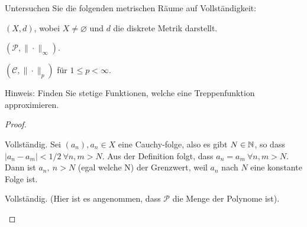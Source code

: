 \begin{Problem}
	Untersuchen Sie die folgenden metrischen Räume auf Vollständigkeit:
	\begin{parts}
	\item $(X,d)$, wobei $X\neq \varnothing$ und $d$ die diskrete Metrik darstellt.
	\item $(\mathcal{P},\|\cdot\|_\infty)$.
	\item $(\mathcal{C},\|\cdot\|_p)$ f\"{u}r $1\le p < \infty$.

		{\footnotesize Hinweis: Finden Sie stetige Funktionen, welche eine Treppenfunktion approximieren.}  
	\end{parts}
\end{Problem}
\begin{proof}
	\begin{parts}
	\item Vollständig. Sei $(a_n),a_n\in X$ eine Cauchy-folge, also es gibt $N\in \mathbb{N}$, so dass $|a_n-a_m|<1 / 2~\forall n,m>N$. Aus der Definition folgt, dass $a_n=a_m~\forall n,m>N$. Dann ist $a_n,~n>N$ (egal welche N) der Grenzwert, weil $a_n$ nach $N$ eine konstante Folge ist.
	\item Vollständig. (Hier ist es angenommen, dass $\mathcal{P}$ die Menge der Polynome ist). 


\end{parts}
\end{proof}
